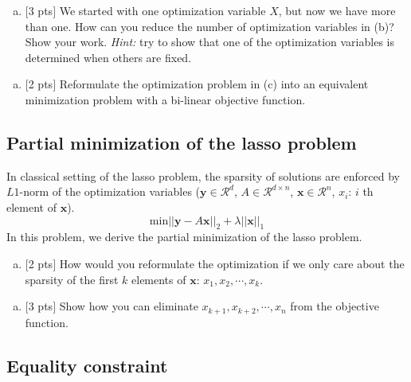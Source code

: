 \documentclass[12pt]{article}
\begin{document}
\begin{enumerate}[(c)]
\item 
$[$3 pts$]$ We started with one optimization variable $X$, but now we have more than one. How can you reduce the number of optimization variables in (b)? Show your work. {\it Hint:} try to show that one of the optimization variables is determined when others are fixed.
\end{enumerate}
\vspace{.25cm}

\begin{enumerate}[(d)]
\item 
$[$2 pts$]$ Reformulate the optimization problem in (c) into an equivalent minimization problem with a bi-linear objective function.
\end{enumerate}
\vspace{.25cm}

\subsection{Partial minimization of the lasso problem}

In classical setting of the lasso problem, the sparsity of solutions are enforced by $L1$-norm of the optimization variables ($\mathbf{y} \in \mathcal{R}^{d}$, $A \in \mathcal{R}^{d\times n}$, $\mathbf{x}\in \mathcal{R}^{n}$, $x_{i}$: $i$ th element of $\mathbf{x}$).
\begin{equation}
	\text{min}||\mathbf{y}-A\mathbf{x}||_{2}+\lambda ||\mathbf{x}||_{1}
	\label{lasso}
	\nonumber
\end{equation}
In this problem, we derive the partial minimization of the lasso problem.

\begin{enumerate}[(a)]
\item 
$[$2 pts$]$ How would you reformulate the optimization if we only care about the sparsity of the first $k$ elements of $\mathbf{x}$: $x_{1},x_{2},\cdots,x_{k}$. 
\end{enumerate}
\vspace{.25cm}

\begin{enumerate}[(b)]
\item 
$[$3 pts$]$ Show how you can eliminate $x_{k+1},x_{k+2},\cdots,x_{n}$ from the objective function.
\end{enumerate}
\vspace{.25cm}

\subsection{Equality constraint}
\end{document}
